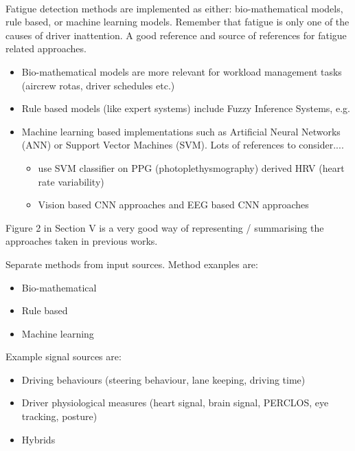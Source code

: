 \documentclass[11pt, parskip=half*,twoside=false]{scrbook}
\begin{document}
\paragraph{\citep{sikanderDriverFatigueDetection2019}} Fatigue detection methods are implemented as either: bio-mathematical models, rule based, or machine learning models. Remember that fatigue is only one of the causes of driver inattention.  A good reference and source of references for fatigue related approaches.

\begin{itemize}
	\item Bio-mathematical models are more relevant for workload management tasks (aircrew rotas, driver schedules etc.)
	\item Rule based models (like expert systems) include Fuzzy Inference Systems, e.g. \citep{aksjonovDetectionEvaluationDriver2019}
	\item Machine learning based implementations such as Artificial Neural Networks (ANN) or Support Vector Machines (SVM). Lots of references to consider....
	\begin{itemize}
		\item \citet{liDetectionDriverDrowsiness2013} use SVM classifier on PPG (photoplethysmography) derived HRV (heart rate variability)
		\item Vision based CNN approaches \citep{yuDriverDrowsinessDetection2019} and EEG based CNN approaches \citep{gaoEEGBasedSpatioTemporal2019}
	\end{itemize}
\end{itemize}

Figure 2 in Section \textsc{V} is a very good way of representing / summarising the approaches taken in previous works.

Separate methods from input sources.  Method exanples are:
\begin{itemize}
	\item Bio-mathematical
	\item Rule based
	\item Machine learning
\end{itemize}

Example signal sources are:
\begin{itemize}
	\item Driving behaviours (steering behaviour, lane keeping, driving time)
	\item Driver physiological measures (heart signal, brain signal, PERCLOS, eye tracking, posture)
	\item Hybrids
\end{itemize}
\end{document}
